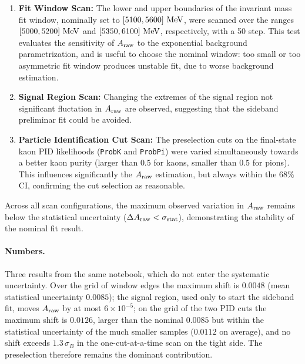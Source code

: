 \begin{enumerate}[leftmargin=*]
    \item \textbf{Fit Window Scan:} The lower and upper boundaries of the invariant mass fit window, nominally set to $[5100, 5600]\,\,\text{Me\hspace{-.08em}V}$, were scanned over the ranges $[5000, 5200]\,\,\text{Me\hspace{-.08em}V}$ and $[5350, 6100]\,\,\text{Me\hspace{-.08em}V}$, respectively, with a 50 \MeV step. This test evaluates the sensitivity of $A_{\mathrm{raw}}$ to the exponential background parametrization, and is useful to choose the nominal window: too small or too asymmetric fit window produces unstable fit, due to worse background estimation.

    \item \textbf{Signal Region Scan:} Changing the extremes of the signal region not significant fluctation in $A_{\mathrm{raw}}$ are observed, suggesting that the sideband preliminar fit could be avoided.

    \item \textbf{Particle Identification Cut Scan:} The preselection cuts on the final-state kaon PID likelihoods (\texttt{ProbK} and \texttt{ProbPi}) were varied simultaneously towards a better kaon purity (larger than $0.5$ for kaons, smaller than $0.5$ for pions). This influences significantly the $A_{\mathrm{raw}}$ estimation, but always within the $68\%$ CI, confirming the cut selection as reasonable.
\end{enumerate}

Across all scan configurations, the maximum observed variation in $A_{\mathrm{raw}}$ remains below the statistical uncertainty ($\Delta A_{\mathrm{raw}} < \sigma_{\mathrm{stat}}$), demonstrating the stability of the nominal fit result.

\paragraph*{Numbers.} Three results from the same notebook, which do not enter the systematic uncertainty. Over the grid of window edges the maximum shift is $0.0048$ (mean statistical uncertainty $0.0085$); the signal region, used only to start the sideband fit, moves $A_{\mathrm{raw}}$ by at most $6\times10^{-5}$; on the grid of the two PID cuts the maximum shift is $0.0126$, larger than the nominal $0.0085$ but within the statistical uncertainty of the much smaller samples ($0.0112$ on average), and no shift exceeds $1.3\,\sigma_B$ in the one-cut-at-a-time scan on the tight side. The preselection therefore remains the dominant contribution.